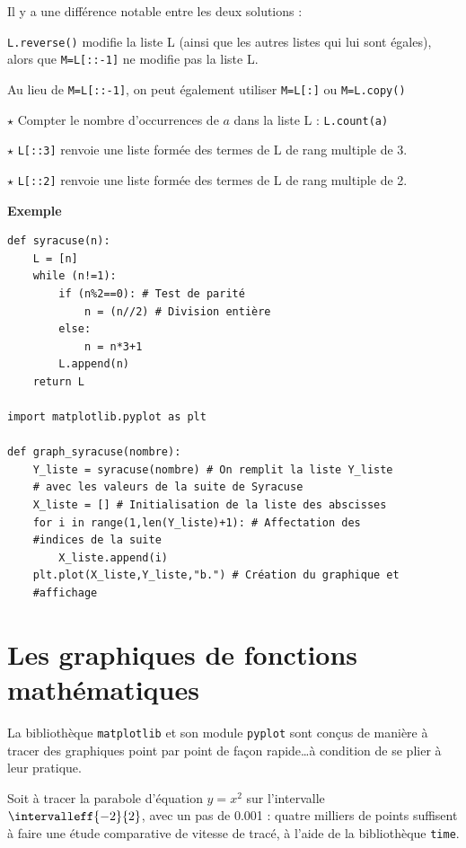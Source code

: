 \danger Il y a une différence notable entre les deux solutions :

\verb!L.reverse()! modifie la liste L (ainsi que les autres listes qui lui sont égales), alors que
\verb~M=L[::-1]~ ne modifie pas la liste L.

Au lieu de \verb!M=L[::-1]!, on peut également utiliser 
\verb!M=L[:]! ou \verb!M=L.copy()!

$\star$ Compter le nombre d'occurrences de $a$ dans la liste L :
\verb!L.count(a)!

$\star$ \verb!L[::3]! renvoie une liste formée des termes de L de rang multiple de 3.

$\star$ \verb!L[::2]! renvoie une liste formée des termes de L de rang multiple de 2.

\medskip

\textbf{\large Exemple}

\begin{lstlisting}
def syracuse(n):
    L = [n]
    while (n!=1):
        if (n%2==0): # Test de parité
            n = (n//2) # Division entière
        else:
            n = n*3+1
        L.append(n)
    return L

import matplotlib.pyplot as plt

def graph_syracuse(nombre):
    Y_liste = syracuse(nombre) # On remplit la liste Y_liste
    # avec les valeurs de la suite de Syracuse
    X_liste = [] # Initialisation de la liste des abscisses
    for i in range(1,len(Y_liste)+1): # Affectation des 
    #indices de la suite
        X_liste.append(i)
    plt.plot(X_liste,Y_liste,"b.") # Création du graphique et 
    #affichage
\end{lstlisting}

\section{Les graphiques de fonctions mathématiques}

La bibliothèque \verb!matplotlib! et son module \verb!pyplot! sont conçus de manière à tracer des graphiques point
par point de façon rapide\dots à condition de se plier à leur pratique.

Soit à tracer la parabole d'équation $y=x^2$ sur l'intervalle $\intervalleff{-2}{2}$, avec un pas de 0.001 : quatre milliers de
points suffisent à faire une étude comparative de vitesse de tracé, à l'aide de la bibliothèque \verb!time!.

